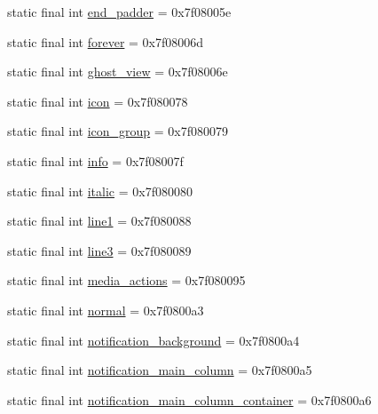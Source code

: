 \begin{DoxyCompactItemize}
\item 
static final int \mbox{\hyperlink{classandroid_1_1support_1_1transition_1_1R_1_1id_a1c225e272cf291b93a0b849d3c2846ef}{end\+\_\+padder}} = 0x7f08005e
\item 
static final int \mbox{\hyperlink{classandroid_1_1support_1_1transition_1_1R_1_1id_a38354973a8adcee1a8a56240acf674bb}{forever}} = 0x7f08006d
\item 
static final int \mbox{\hyperlink{classandroid_1_1support_1_1transition_1_1R_1_1id_a333cce399e723d86e6164069e17484aa}{ghost\+\_\+view}} = 0x7f08006e
\item 
static final int \mbox{\hyperlink{classandroid_1_1support_1_1transition_1_1R_1_1id_aa2f972494c0d7b910dd334c97f0772e6}{icon}} = 0x7f080078
\item 
static final int \mbox{\hyperlink{classandroid_1_1support_1_1transition_1_1R_1_1id_a08ac623c6ab50ea0df40c5238d71d1c4}{icon\+\_\+group}} = 0x7f080079
\item 
static final int \mbox{\hyperlink{classandroid_1_1support_1_1transition_1_1R_1_1id_ae08413c0d77b9044bbe26ee181089869}{info}} = 0x7f08007f
\item 
static final int \mbox{\hyperlink{classandroid_1_1support_1_1transition_1_1R_1_1id_a7213dcb4b1139d5bf1ce002b876e5de1}{italic}} = 0x7f080080
\item 
static final int \mbox{\hyperlink{classandroid_1_1support_1_1transition_1_1R_1_1id_a2ab7b382860fb7936200212780d2132a}{line1}} = 0x7f080088
\item 
static final int \mbox{\hyperlink{classandroid_1_1support_1_1transition_1_1R_1_1id_a80854f8678321c5cb7a484e765f9dc81}{line3}} = 0x7f080089
\item 
static final int \mbox{\hyperlink{classandroid_1_1support_1_1transition_1_1R_1_1id_a74178728702fd182f8567758c7e846f6}{media\+\_\+actions}} = 0x7f080095
\item 
static final int \mbox{\hyperlink{classandroid_1_1support_1_1transition_1_1R_1_1id_a1c89776c0d58c58e156d6de957fb1ea2}{normal}} = 0x7f0800a3
\item 
static final int \mbox{\hyperlink{classandroid_1_1support_1_1transition_1_1R_1_1id_a3dc75722edc5e00de09783de28d80caf}{notification\+\_\+background}} = 0x7f0800a4
\item 
static final int \mbox{\hyperlink{classandroid_1_1support_1_1transition_1_1R_1_1id_a381db437d0b325d78a0ff8c46dc77ff1}{notification\+\_\+main\+\_\+column}} = 0x7f0800a5
\item 
static final int \mbox{\hyperlink{classandroid_1_1support_1_1transition_1_1R_1_1id_ae81ddff59aa2cc6a5d146fa6fd8e9969}{notification\+\_\+main\+\_\+column\+\_\+container}} = 0x7f0800a6

\end{DoxyCompactItemize}

